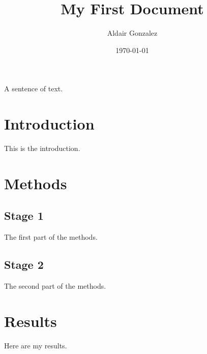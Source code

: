 \documentclass[a4paper,12pt]{article}
\begin{document}
\title{My First Document}
\author{Aldair Gonzalez}
\date{\today}
\maketitle
A sentence of text.

\section{Introduction}
This is the introduction.

\section{Methods}
\subsection{Stage 1}
The first part of the methods.

\subsection{Stage 2}
The second part of the methods.

\section{Results}
Here are my results.
\end{document}
